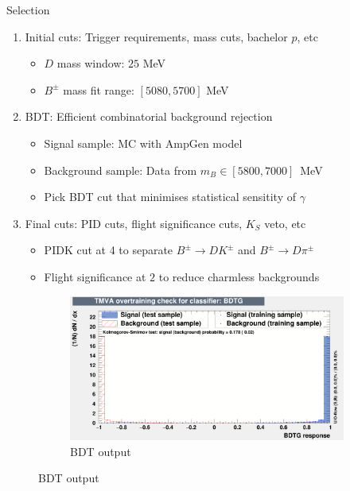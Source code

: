 \documentclass{beamer}
\begin{document}
\begin{frame}{Selection}
  \begin{enumerate}
    \setlength\itemsep{0.0em}
    \item{Initial cuts: Trigger requirements, mass cuts, bachelor $p$, etc}
    \begin{itemize}
      \item{$D$ mass window: $25$ MeV}
      \item{$B^\pm$ mass fit range: $[5080, 5700]$ MeV}
    \end{itemize}
    \item{BDT: Efficient combinatorial background rejection}
    \begin{itemize}
      \item{Signal sample: MC with AmpGen model}
      \item{Background sample: Data from $m_B\in[5800, 7000]$~MeV}
      \item{Pick BDT cut that minimises statistical sensitity of $\gamma$}
    \end{itemize}
    \item{Final cuts: PID cuts, flight significance cuts, $K_S$ veto, etc}
    \begin{itemize}
      \item{PIDK cut at 4 to separate $B^\pm\to DK^\pm$ and $B^\pm\to D\pi^\pm$}
      \item{Flight significance at $2$ to reduce charmless backgrounds}
    \end{itemize}
  \end{enumerate}
  \begin{figure}
    \centering
    \begin{subfigure}{0.4\textwidth}
      \includegraphics[width = 1.0\textwidth]{Plots/overtrain_BDTG.png}
      \caption{BDT output}
    \end{subfigure}%

\end{figure}
\end{frame}
\end{document}
